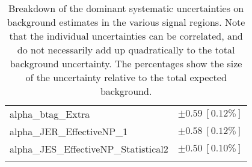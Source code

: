 \begin{table}
\begin{center}
\begin{tabular*}{\textwidth}{@{\extracolsep{\fill}}lc}
alpha\_btag\_Extra         & $\pm 0.59\ [0.12\%] $       \\
alpha\_JER\_EffectiveNP\_1         & $\pm 0.58\ [0.12\%] $       \\
alpha\_JES\_EffectiveNP\_Statistical2         & $\pm 0.50\ [0.10\%] $       \\
\noalign{\smallskip}\hline\noalign{\smallskip}
\end{tabular*}
\end{center}
\caption[Breakdown of uncertainty on background estimates]{
Breakdown of the dominant systematic uncertainties on background estimates in the various signal regions.
Note that the individual uncertainties can be correlated, and do not necessarily add up quadratically to 
the total background uncertainty. The percentages show the size of the uncertainty relative to the total expected background.
\label{table.results.bkgestimate.uncertainties.TRMMEM_cuts}}
\end{table}
%